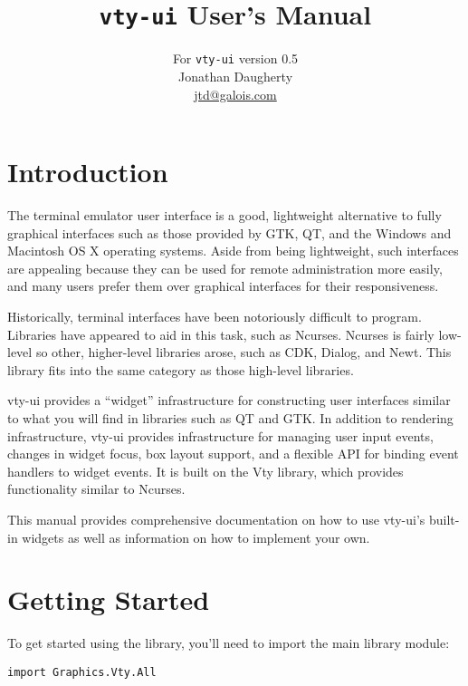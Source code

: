\documentclass[11pt, letterpaper, oneside, titlepage]{article}
\begin{document}
\vsize 9.0in

\title{\texttt{vty-ui} User's Manual}
\author{
  For \texttt{vty-ui} version 0.5\\
  Jonathan Daugherty\\
  \href{mailto:jtd@galois.com}{jtd@galois.com}
}
\maketitle

\tableofcontents
\newpage

\section{Introduction}

The terminal emulator user interface is a good, lightweight
alternative to fully graphical interfaces such as those provided by
GTK, QT, and the Windows and Macintosh OS X operating systems.  Aside
from being lightweight, such interfaces are appealing because they can
be used for remote administration more easily, and many users prefer
them over graphical interfaces for their responsiveness.

Historically, terminal interfaces have been notoriously difficult to
program.  Libraries have appeared to aid in this task, such as
Ncurses.  Ncurses is fairly low-level so other, higher-level libraries
arose, such as CDK, Dialog, and Newt.  This library fits into the same
category as those high-level libraries.

vty-ui provides a “widget” infrastructure for constructing user
interfaces similar to what you will find in libraries such as QT and
GTK.  In addition to rendering infrastructure, vty-ui provides
infrastructure for managing user input events, changes in widget focus,
box layout support, and a flexible API for binding event handlers to
widget events.  It is built on the Vty library, which provides
functionality similar to Ncurses.

This manual provides comprehensive documentation on how to use
vty-ui's built-in widgets as well as information on how to implement
your own.

\section{Getting Started}

To get started using the library, you'll need to import the main library
module:

\begin{verbatim}
import Graphics.Vty.All
\end{verbatim}
\end{document}
